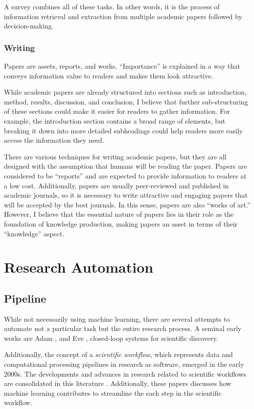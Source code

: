 \documentclass{book}
\begin{document}
A survey combines all of these tasks. In other words, it is the process of information retrieval and extraction from multiple academic papers followed by decision-making.
\subsection{Writing}

Papers are assets, reports, and works.
``Importance'' is explained in a way that conveys information value to readers and makes them look attractive.

While academic papers are already structured into sections such as introduction, method, results, discussion, and conclusion, I believe that further sub-structuring of these sections could make it easier for readers to gather information. For example, the introduction section contains a broad range of elements, but breaking it down into more detailed subheadings could help readers more easily access the information they need.

There are various techniques for writing academic papers, but they are all designed with the assumption that humans will be reading the paper. Papers are considered to be ``reports'' and are expected to provide information to readers at a low cost. Additionally, papers are usually peer-reviewed and published in academic journals, so it is necessary to write attractive and engaging papers that will be accepted by the best journals. In this sense, papers are also ``works of art.'' However, I believe that the essential nature of papers lies in their role as the foundation of knowledge production, making papers an asset in terms of their ``knowledge'' aspect.


\chapter{Research Automation}

\section{Pipeline}
While not necessarily using machine learning, there are several attempts to automate not a particular task but the entire research process. A seminal early works are Adam \cite{king2004functional}, and Eve \cite{williams2015cheaper}, closed-loop systems for scientific discovery. 

Additionally, the concept of a \textit{scientific workflow}, which represents data and computational processing pipelines in research as software, emerged in the early 2000s. The developments and advances in research related to scientific workflows are consolidated in this literature \cite{barker2008scientific,atkinson2017scientific}. Additionally, these papers \cite{deelman2019role,nouri2021exploring} discusses how machine learning contributes to streamline the each step in the scientific workflow.
\end{document}
